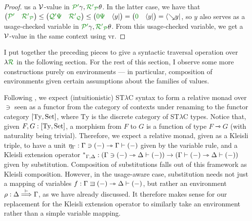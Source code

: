 \begin{proof}
  us a $\mathcal V$-value in $\grPprime\gamma, \grR\gr'_\grP\theta$.
  In the latter case, we have that
  $\begin{pmatrix} \grPprime & \grR\gr'_\grP \end{pmatrix}
  \leq \begin{pmatrix} \grQprime\gr\Psi & \grR\gr'_\grQ \end{pmatrix}
  \leq \begin{pmatrix} \gr0\gr\Psi & \langle y \rvert \end{pmatrix}
  = \begin{pmatrix} \gr0 & \langle y \rvert \end{pmatrix}
  = \left\langle {\searrow}y \right\rvert$, so $y$ also serves as a
  usage-checked variable in $\grPprime\gamma, \grR\gr'_\grP\theta$.
  From this usage-checked variable, we get a $\mathcal V$-value in the same context
  using $\mathrm{vr}$.
\end{proof}

I put together the preceding pieces to give a syntactic traversal operation over
$\name$ in the following section.
For the rest of this section, I observe some more constructions purely on
environments --- in particular, composition of environments given certain
assumptions about the families of values.

Following \citet{ACU15}, we expect (intuitionistic) ST$\lambda$C syntax to form
a relative monad over $\ni$ seen as a functor from the category of contexts
under renaming to the functor category $\blr{\mathrm{Ty}, \Set}$, where
$\mathrm{Ty}$ is the discrete category of ST$\lambda$C types.
Notice that, given $F,G : \blr{\mathrm{Ty}, \Set}$, a morphism from $F$ to $G$
is a function of type $F \rightarrowtriangle G$ (with naturality being trivial).
Therefore, we expect a relative monad, given as a Kleisli triple, to have a unit
$\eta_\Gamma : \Gamma \ni \plr{-} \rightarrowtriangle \Gamma \vdash \plr{-}$
given by the variable rule, and a Kleisli extension operator
${^*}_{\Gamma,\Delta} :
\plr{\Gamma \ni \plr{-} \rightarrowtriangle \Delta \vdash \plr{-}} \to
\plr{\Gamma \vdash \plr{-} \rightarrowtriangle \Delta \vdash \plr{-}}$
given by substitution.
Composition of substitutions falls out of this framework as Kleisli composition.
However, in the usage-aware case, substitution needs not just a mapping of
variables $f : \Gamma \sqni \plr{-} \rightarrowtriangle \Delta \vdash \plr{-}$,
but rather an environment $\rho : \Delta \stackrel{\vdash}\Longrightarrow \Gamma$, as we have already
discussed.
It therefore makes sense for our replacement for the Kleisli extension operator
to similarly take an environment rather than a simple variable mapping.

